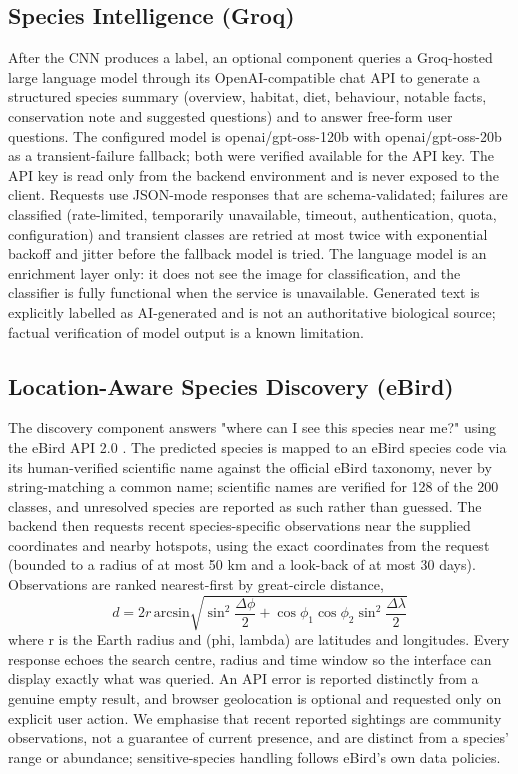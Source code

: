 \documentclass[conference]{IEEEtran}
\begin{document}
\subsection{Species Intelligence (Groq)}
After the CNN produces a label, an optional component queries a Groq-hosted large language model through its OpenAI-compatible chat API to generate a structured species summary (overview, habitat, diet, behaviour, notable facts, conservation note and suggested questions) and to answer free-form user questions. The configured model is openai/gpt-oss-120b with openai/gpt-oss-20b as a transient-failure fallback; both were verified available for the API key. The API key is read only from the backend environment and is never exposed to the client. Requests use JSON-mode responses that are schema-validated; failures are classified (rate-limited, temporarily unavailable, timeout, authentication, quota, configuration) and transient classes are retried at most twice with exponential backoff and jitter before the fallback model is tried. The language model is an enrichment layer only: it does not see the image for classification, and the classifier is fully functional when the service is unavailable. Generated text is explicitly labelled as AI-generated and is not an authoritative biological source; factual verification of model output is a known limitation.
\subsection{Location-Aware Species Discovery (eBird)}
The discovery component answers "where can I see this species near me?" using the eBird API 2.0 \cite{ref16}. The predicted species is mapped to an eBird species code via its human-verified scientific name against the official eBird taxonomy, never by string-matching a common name; scientific names are verified for 128 of the 200 classes, and unresolved species are reported as such rather than guessed. The backend then requests recent species-specific observations near the supplied coordinates and nearby hotspots, using the exact coordinates from the request (bounded to a radius of at most 50 km and a look-back of at most 30 days). Observations are ranked nearest-first by great-circle distance,
\begin{equation}
d = 2r\,\mathrm{arcsin}\sqrt{\sin^{2}\frac{\Delta\phi}{2} + \cos\phi_1\cos\phi_2\sin^{2}\frac{\Delta\lambda}{2}}
\end{equation}
where r is the Earth radius and (phi, lambda) are latitudes and longitudes. Every response echoes the search centre, radius and time window so the interface can display exactly what was queried. An API error is reported distinctly from a genuine empty result, and browser geolocation is optional and requested only on explicit user action. We emphasise that recent reported sightings are community observations, not a guarantee of current presence, and are distinct from a species' range or abundance; sensitive-species handling follows eBird's own data policies.
\end{document}
